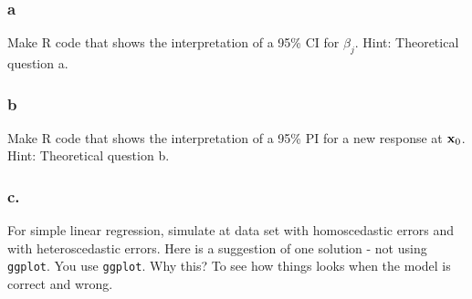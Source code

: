 \documentclass[]{article}
\begin{document}
\subsubsection{a}\label{a-2}

Make R code that shows the interpretation of a 95\% CI for \(\beta_j\).
Hint: Theoretical question a.

\subsubsection{b}\label{b-2}

Make R code that shows the interpretation of a 95\% PI for a new
response at \({\bf x}_0\). Hint: Theoretical question b.

\subsubsection{c.}\label{c.}

For simple linear regression, simulate at data set with homoscedastic
errors and with heteroscedastic errors. Here is a suggestion of one
solution - not using \texttt{ggplot}. You use \texttt{ggplot}. Why this?
To see how things looks when the model is correct and wrong.
\end{document}
